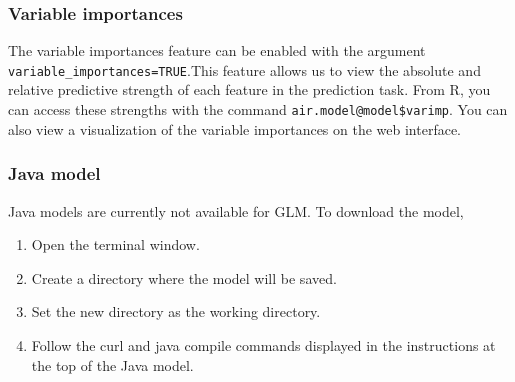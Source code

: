 \subsubsection{Variable importances} \label{3.3.1}
The variable importances feature can be enabled with the argument \texttt{variable\_importances=TRUE}.This feature allows us to view the absolute and relative predictive strength of each feature in the prediction task. From R, you can access these strengths with the command \texttt{air.model@model\$varimp}. You can also view a visualization of the variable
importances on the web interface.

\subsubsection{Java model} %
Java models are currently not available for GLM.
To download the model, 
\begin{enumerate}
\item Open the terminal window. 
\item Create a directory where the model will be saved.
\item Set the new directory as the working directory.
\item Follow the curl and java compile commands displayed in the instructions at the top of the Java model.
\end{enumerate}
\newpage





